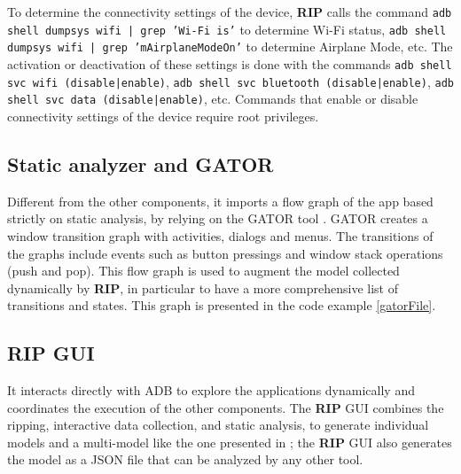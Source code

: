 To determine the connectivity settings of the device, \textbf{RIP} calls the command \texttt {adb shell dumpsys wifi | grep 'Wi-Fi is'} to determine Wi-Fi status, \texttt {adb shell dumpsys wifi | grep 'mAirplaneModeOn'} to determine Airplane Mode, etc. The activation or deactivation of these settings is done with the commands  \texttt {adb shell svc wifi (disable|enable)}, \texttt {adb shell svc bluetooth (disable|enable)}, \texttt {adb shell svc data (disable|enable)}, etc. Commands that enable or disable connectivity settings of the device require root privileges.


\subsection{Static analyzer and GATOR}
Different from the other components, it imports a flow graph of the app based strictly on static analysis, by relying on the GATOR tool \cite{gator}. GATOR creates a window transition graph with activities, dialogs and menus. The transitions of the graphs include events such as button pressings and window stack operations (push and pop). This flow graph is used to augment the model collected dynamically by  \textbf{RIP}, in particular to have a more comprehensive list of transitions and states. This graph is presented in the code example \ref{gatorFile}.

%	

\subsection {RIP GUI}
It interacts directly with ADB to explore the applications dynamically and coordinates the execution of the other components. The \textbf{RIP} GUI combines the ripping, interactive data collection, and static analysis, to generate individual models and a multi-model like the one presented in ; the \textbf{RIP} GUI also generates the model as a JSON file that can be analyzed by any other tool.


